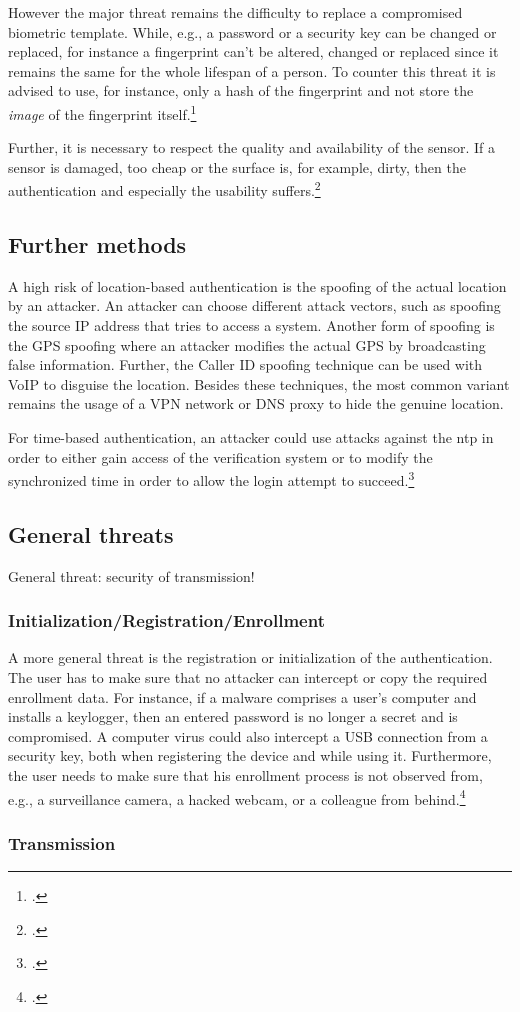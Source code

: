 However the major threat remains the difficulty to replace a compromised biometric template. While, e.g., a password or a security key can be changed or replaced, for instance a fingerprint can't be altered, changed or replaced since it remains the same for the whole lifespan of a person. To counter this threat it is advised to use, for instance, only a hash of the fingerprint and not store the \textit{image} of the fingerprint itself.\footcite[See][266]{shostack2014threat}

Further, it is necessary to respect the quality and availability of the sensor. If a sensor is damaged, too cheap or the surface is, for example, dirty, then the authentication and especially the usability suffers.\footcite[See][37]{265831}

\subsection{Further methods}

A high risk of location-based authentication is the spoofing of the actual location by an attacker. An attacker can choose different attack vectors, such as spoofing the source IP address that tries to access a system. Another form of spoofing is the GPS spoofing where an attacker modifies the actual GPS by broadcasting false information. Further, the Caller ID spoofing technique can be used with VoIP to disguise the location. Besides these techniques, the most common variant remains the usage of a VPN network or DNS proxy to hide the genuine location.

For time-based authentication, an attacker could use attacks against the \gls{ntp} in order to either gain access of the verification system or to modify the synchronized time in order to allow the login attempt to succeed.\footcite[See][]{malhotraattacking}

\subsection{General threats}

General threat: security of transmission!

\subsubsection{Initialization/Registration/Enrollment}

A more general threat is the registration or initialization of the authentication. The user has to make sure that no attacker can intercept or copy the required enrollment data. For instance, if a malware comprises a user’s computer and installs a keylogger, then an entered password is no longer a secret and is compromised. A computer virus could also intercept a USB connection from a security key, both when registering the device and while using it. Furthermore, the user needs to make sure that his enrollment process is not observed from, e.g., a surveillance camera, a hacked webcam, or a colleague from behind.\footcites[See][152--153]{10.1007/978-3-642-39235-1_9}[See][61]{Ulqinaku:2019:FPP:3317549.3323404}

\subsubsection{Transmission}
